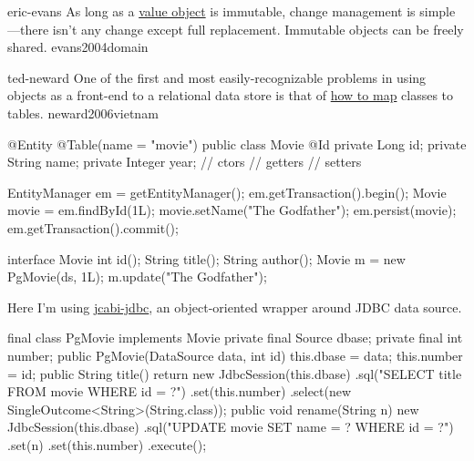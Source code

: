 \documentclass{article}
\begin{document}
\qte
  {eric-evans}
  {As long as a \ul{value object} is immutable, change management is simple---there isn't any change except full replacement. Immutable objects can be freely shared.}
  {evans2004domain}



\qte
  {ted-neward}
  {One of the first and most easily-recognizable problems in using objects as a front-end to a relational data store is that of \ul{how to map} classes to tables.}
  {neward2006vietnam}

\begin{pptWide}{2}
{\small\begin{ffcode}
@Entity
@Table(name = "movie")
public class Movie {
  @Id
  private Long id;
  private String name;
  private Integer year;
  // ctors
  // getters
  // setters
}
\end{ffcode}
}
\par\columnbreak\par
{\small\begin{ffcode}
EntityManager em = getEntityManager();
em.getTransaction().begin();
Movie movie = em.findById(1L);
movie.setName("The Godfather");
em.persist(movie);
em.getTransaction().commit();
\end{ffcode}
}
\end{pptWide}
\par
\plush{}

\begin{pptWide}{2}
{\small\begin{ffcode}
interface Movie {
  int id();
  String title();
  String author();
}
Movie m = new PgMovie(ds, 1L);
m.update("The Godfather");
\end{ffcode}
}
\par
Here I'm using \href{https://github.com/jcabi/jcabi-jdbc}{jcabi-jdbc},
an object-oriented wrapper around JDBC data source.
\par\columnbreak\par
{\scriptsize\begin{ffcode}
final class PgMovie implements Movie
  private final Source dbase;
  private final int number;
  public PgMovie(DataSource data, int id)
    this.dbase = data;
    this.number = id;
  public String title()
    return new JdbcSession(this.dbase)
      .sql("SELECT title FROM movie WHERE id = ?")
      .set(this.number)
      .select(new SingleOutcome<String>(String.class));
  public void rename(String n)
    new JdbcSession(this.dbase)
      .sql("UPDATE movie SET name = ? WHERE id = ?")
      .set(n)
      .set(this.number)
      .execute();
\end{ffcode}
}
\end{pptWide}
\par
\plush{}
\end{document}
